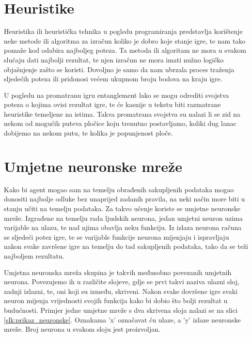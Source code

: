 \documentclass[zavrsnirad]{fer}
\begin{document}
\section{Heuristike}
\label{pog:opis_heuristika}


Heuristika ili heuristička tehnika u pogledu programiranja predstavlja korištenje neke metode ili algoritma za izračun koliko je dobro koje stanje igre, te nam tako pomaže kod odabira najboljeg poteza. Ta metoda ili algoritam ne mora u svakom slučaju dati najbolji rezultat, te njen izračun ne mora imati nužno logičko objašnjenje zašto se koristi. Dovoljno je samo da nam ubrzala proces traženja sljedećih poteza ili pridonosi većem ukupnom broju bodova na kraju igre.

U pogledu na promatranu igru entanglement lako se mogu odrediti svojstva poteza o kojima ovisi rezultat igre, te će kasnije u tekstu biti razmatrane heuristike temeljene na istima. Takva promatrana svojstva su nalazi li se zid na nekom od mogućih puteva pločice koju trenutno postavljamo, koliki dug lanac dobijemo na nekom putu, te kolika je popunjenost ploče. 



\section{Umjetne neuronske mreže}
\label{pog:opis_neuronskih}

Kako bi agent mogao sam na temelju obrađenih sakupljenih podataka mogao donositi najbolje odluke bez unaprijed zadanih pravila, na neki način more biti u stanju učiti na temelju podataka. Za takvo učenje koriste se umjetne neuronske mreže. Izgrađene na temelju rada ljudskih neurona, jedan umjetni neuron uzima varijable na ulazu, te nad njima obavlja neku funkciju. Iz izlaza neurona računa se sljedeći potez igre, te se varijable funkcije neurona mijenjaju i ispravljaju nakon svake završene igre na temelju do tad sakupljenih podataka, tako da se teži najboljem rezultatu. 

Umjetna neuronska mreža skupina je takvih međusobno povezanih umjetnih neurona. Povezujemo ih u različite slojeve, gdje se prvi takvi naziva ulazni sloj, zadnji izlazni, te, oni koji su između, skriveni. Nakon svake dovršene igre svaki neuron mijenja vrijednosti svojih funkcija kako bi dobio što bolji rezultat u budućnosti. Primjer jedne umjetne mreže s dva skrivena sloja nalazi se na slici \ref{slk:prikaz_neuronske}. Oznakama 'x' označavat ću ulaze, a 'y' izlaze neuronske mreže. Broj neurona u svakom sloju jest proizvoljan.
\end{document}
